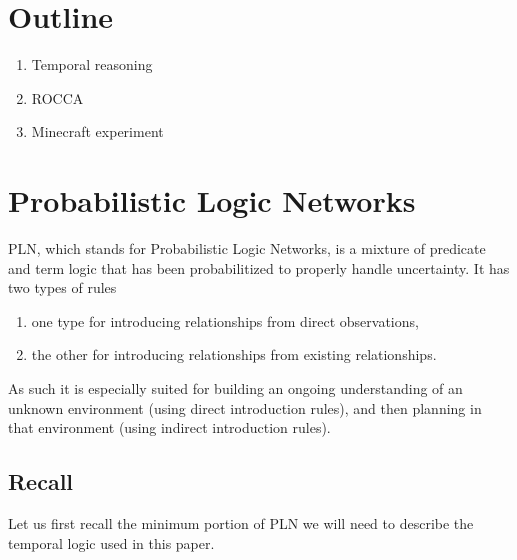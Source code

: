 \documentclass[runningheads]{llncs}
\begin{document}
\section{Outline}

\begin{enumerate}
\item Temporal reasoning
\item ROCCA
\item Minecraft experiment
\end{enumerate}

\section{Probabilistic Logic Networks}

PLN, which stands for Probabilistic Logic Networks, is a mixture of
predicate and term logic that has been probabilitized to properly
handle uncertainty.  It has two types of rules
\begin{enumerate}
\item one type for introducing relationships from direct observations,
\item the other for introducing relationships from existing
  relationships.
\end{enumerate}
As such it is especially suited for building an ongoing understanding
of an unknown environment (using direct introduction rules), and then
planning in that environment (using indirect introduction rules).

\subsection{Recall}

Let us first recall the minimum portion of PLN we will need to
describe the temporal logic used in this paper.
\end{document}
